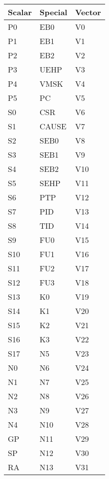 \begin{table}[hbt!]

    \begin{center}

    \begin{tabular}{|l|l|l|}

        \hline
        Scalar & Special & Vector \\
        \hline
        \addlinespace[10pt]
        \hline
        P0 & EB0 & V0 \\
        \hline
        P1 & EB1 & V1 \\
        \hline
        P2 & EB2 & V2 \\
        \hline
        P3 & UEHP & V3 \\
        \hline
        P4 & VMSK & V4 \\
        \hline
        P5 & PC & V5 \\
        \hline
        S0 & CSR & V6 \\
        \hline
        S1 & CAUSE & V7 \\
        \hline
        S2 & SEB0 & V8 \\
        \hline
        S3 & SEB1 & V9 \\
        \hline
        S4 & SEB2 & V10 \\
        \hline
        S5 & SEHP & V11 \\
        \hline
        S6 & PTP & V12 \\
        \hline
        S7 & PID & V13 \\
        \hline
        S8 & TID & V14 \\
        \hline
        S9 & FU0 & V15 \\
        \hline
        S10 & FU1 & V16 \\
        \hline
        S11 & FU2 & V17 \\
        \hline
        S12 & FU3 & V18 \\
        \hline
        S13 & K0 & V19 \\
        \hline
        S14 & K1 & V20 \\
        \hline
        S15 & K2 & V21 \\
        \hline
        S16 & K3 & V22 \\
        \hline
        S17 & N5 & V23 \\
        \hline
        N0 & N6 & V24 \\
        \hline
        N1 & N7 & V25 \\
        \hline
        N2 & N8 & V26 \\
        \hline
        N3 & N9 & V27 \\
        \hline
        N4 & N10 & V28 \\
        \hline
        GP & N11 & V29 \\
        \hline
        SP & N12 & V30 \\
        \hline
        RA & N13 & V31 \\
        \hline


\end{tabular}
\end{center}
\end{table}
